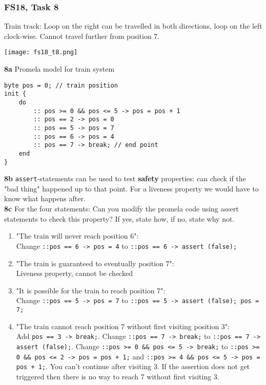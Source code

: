 \documentclass{article}
\begin{document}
\subsubsection{FS18, Task 8}
Train track: Loop on the right can be travelled in both directions, loop on the left clock-wise. Cannot travel further from position 7.
\begin{center}
    \texttt{[image: fs18\_t8.png]}
\end{center}
\textbf{8a} Promela model for train system
\begin{verbatim}
byte pos = 0; // train position
init {
    do
        :: pos >= 0 && pos <= 5 -> pos = pos + 1
        :: pos == 2 -> pos = 0
        :: pos == 5 -> pos = 7
        :: pos == 6 -> pos = 4
        :: pos == 7 -> break; // end point
    end
}
\end{verbatim}
\textbf{8b} \texttt{assert}-statements can be used to test \textbf{safety} properties: can check if the "bad thing" happened up to that point. For a liveness property we would have to know what happens after. \smallskip \\
\textbf{8c} For the four statements: Can you modify the promela code using assert statements to check this property? If yes, state how, if no, state why not.
\begin{enumerate}
    \item "The train will never reach position 6": \\
          Change \texttt{::pos == 6 -> pos = 4} to \texttt{::pos == 6 -> assert (false);}
    \item "The train is guaranteed to eventually position 7":\\
          Liveness property, cannot be checked
    \item "It is possible for the train to reach position 7": \\
          Change \texttt{::pos == 5 -> pos = 7} to \texttt{::pos == 5 -> assert (false); pos = 7;}
    \item "The train cannot reach position 7 without first visiting position 3": \\
          Add \texttt{pos == 3 -> break;}. Change \texttt{::pos == 7 -> break;} to \texttt{::pos == 7 -> assert (false);}. Change \texttt{::pos >= 0 \&\& pos <= 5 -> break;} to \texttt{::pos >= 0 \&\& pos <= 2 -> pos = pos + 1;} and  \texttt{::pos >= 4 \&\& pos <= 5 -> pos = pos + 1;}. You can't continue after visiting 3. If the assertion does not get triggered then there is no way to reach 7 without first visiting 3.

\end{enumerate}
\end{document}
